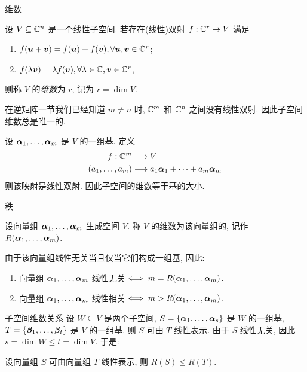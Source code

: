 \begin{frame}{维数}
	\onslide<+->
	\begin{definition}[维数]
		设 $V\subseteq {\mathbb{C}}^n$ 是一个线性子空间.
		若存在(线性)双射 $f:{\mathbb{C}}^r\to V$ 满足
		\begin{enumerate}[<*>]
			\item $f({\boldsymbol{u}}+{\boldsymbol{v}})=f({\boldsymbol{u}})+f({\boldsymbol{v}}),\forall {\boldsymbol{u}},{\boldsymbol{v}}\in{\mathbb{C}}^r$;
			\item $f(\lambda{\boldsymbol{v}})=\lambda f({\boldsymbol{v}}),\forall \lambda\in{\mathbb{C}},{\boldsymbol{v}}\in{\mathbb{C}}^r$,
		\end{enumerate}
		则称 $V$ 的\emph{维数}为 $r$, 记为 $r=\dim V$.
	\end{definition}
	\onslide<+->
	在逆矩阵一节我们已经知道 $m\neq n$ 时, ${\mathbb{C}}^m$ 和 ${\mathbb{C}}^n$ 之间没有线性双射.
	\onslide<+->
	因此子空间维数总是唯一的.

	\onslide<+->
	设 ${\boldsymbol{\alpha}}_1,\dots,{\boldsymbol{\alpha}}_m$ 是 $V$ 的一组基.
	\onslide<+->
	定义
	\begin{align*}
		f:{\mathbb{C}}^m&\longrightarrow V\\
		(a_1,\dots,a_m)&\longrightarrow a_1{\boldsymbol{\alpha}}_1+\cdots+a_m{\boldsymbol{\alpha}}_m
	\end{align*}
	\onslide<+->
	则该映射是线性双射.
	\onslide<+->
	因此子空间的\alert{维数等于基的大小}.
\end{frame}


\begin{frame}{秩}
	\onslide<+->
	\begin{definition}[秩]
		设向量组 ${\boldsymbol{\alpha}}_1,\dots,{\boldsymbol{\alpha}}_m$ 生成空间 $V$.
		称 $V$ 的维数为该向量组的\emph{}, 记作 $R({\boldsymbol{\alpha}}_1,\dots,{\boldsymbol{\alpha}}_m)$.
	\end{definition}
	\onslide<+->
	由于该向量组线性无关当且仅当它们构成一组基,
	\onslide<+->
	因此:
	\begin{theorem}
		\begin{enumerate}
			\item 向量组 ${\boldsymbol{\alpha}}_1,\dots,{\boldsymbol{\alpha}}_m$ 线性无关$\iff m=R({\boldsymbol{\alpha}}_1,\dots,{\boldsymbol{\alpha}}_m)$.
			\item 向量组 ${\boldsymbol{\alpha}}_1,\dots,{\boldsymbol{\alpha}}_m$ 线性相关$\iff m>R({\boldsymbol{\alpha}}_1,\dots,{\boldsymbol{\alpha}}_m)$.
		\end{enumerate}
	\end{theorem}
\end{frame}


\begin{frame}{子空间维数关系}
	\onslide<+->
	设 $W\subseteq V$ 是两个子空间, $S=\{{\boldsymbol{\alpha}}_1,\dots,{\boldsymbol{\alpha}}_s\}$ 是 $W$ 的一组基, $T=\{{\boldsymbol{\beta}}_1,\dots,{\boldsymbol{\beta}}_t\}$ 是 $V$ 的一组基.
	\onslide<+->
	则 $S$ 可由 $T$ 线性表示.
	\onslide<+->
	由于 $S$ 线性无关, 因此 $s=\dim W\le t=\dim V$.
	\onslide<+->
	于是:
	\begin{theorem}
		设向量组 $S$ 可由向量组 $T$ 线性表示, 则 $R(S)\le R(T)$.
	\end{theorem}
\end{frame}


